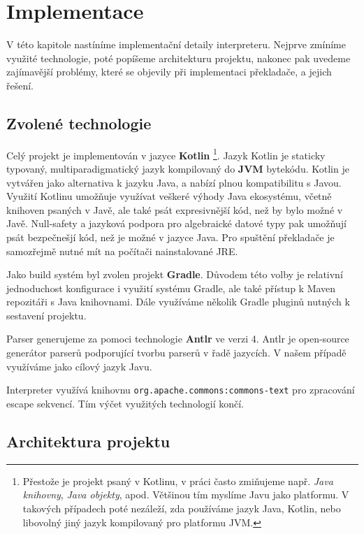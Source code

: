 \chapter{Implementace}

V této kapitole nastíníme implementační detaily interpreteru. Nejprve zmíníme využité technologie,
poté popíšeme architekturu projektu, nakonec pak uvedeme zajímavější problémy, které se objevily
při implementaci překladače, a jejich řešení.

\section{Zvolené technologie}

Celý projekt je implementován v jazyce \textbf{Kotlin} \footnote{Přestože je projekt psaný
  v Kotlinu, v práci často zmiňujeme např. \textit{Java knihovny}, \textit{Java objekty}, apod.
  Většinou tím myslíme Javu jako platformu. V takových případech poté nezáleží, zda
  používáme jazyk Java, Kotlin, nebo libovolný jiný jazyk kompilovaný pro platformu JVM.}.
Jazyk Kotlin je staticky typovaný, multiparadigmatický jazyk kompilovaný do \textbf{JVM} bytekódu.
Kotlin je vytvářen jako alternativa k jazyku Java, a nabízí plnou kompatibilitu s Javou. Využití
Kotlinu umožňuje využívat veškeré výhody Java ekosystému, včetně knihoven psaných v Javě, ale také
psát expresivnější kód, než by bylo možné v Javě. Null-safety a jazyková podpora pro algebraické
datové typy pak umožňují psát bezpečnešjí kód, než je možné v jazyce Java. Pro spuštění překladače
je samozřejmě nutné mít na počítači nainstalované JRE.

Jako build systém byl zvolen projekt \textbf{Gradle}. Důvodem této volby je relativní jednoduchost
konfigurace i využití systému Gradle, ale také přístup k Maven repozitáři s Java knihovnami. Dále
využíváme několik Gradle pluginů nutných k sestavení projektu.

Parser generujeme za pomoci technologie \textbf{Antlr} ve verzi 4. Antlr je open-source generátor
parserů podporující tvorbu parserů v řadě jazycích. V našem případě využíváme jako cílový jazyk
Javu.

Interpreter využívá knihovnu \lstinline{org.apache.commons:commons-text} pro zpracování escape
sekvencí. Tím výčet využitých technologií končí.

\section{Architektura projektu}

